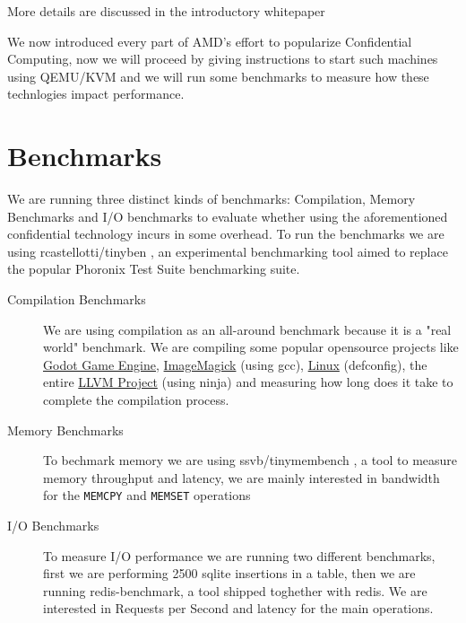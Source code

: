 \documentclass[twocolumn]{article}
\begin{document}
More details are discussed in the introductory whitepaper \cite{sev-snp}

We now introduced every part of AMD's effort to popularize Confidential Computing, now we will proceed by giving instructions to start such machines using QEMU/KVM and we will run some benchmarks to measure how these technlogies impact performance.


\section{Benchmarks}

We are running three distinct kinds of benchmarks: Compilation, Memory Benchmarks and I/O benchmarks to evaluate whether using the aforementioned confidential technology incurs in some overhead. To run the benchmarks we are using rcastellotti/tinyben \cite{tinyben}, an experimental benchmarking tool aimed to replace the popular Phoronix Test Suite \cite{pts} benchmarking suite.

\begin{description}
    \item[Compilation Benchmarks] We are using compilation as an all-around benchmark because it is a "real world" benchmark. We are compiling some popular opensource projects like \href{https://github.com/godotengine/godot}{Godot Game Engine}, \href{https://github.com/imagemagick/imagemagick}{ImageMagick} (using gcc), \href{https://git.kernel.org/pub/scm/linux/kernel/git/torvalds/linux.git}{Linux} (defconfig), the entire \href{https://github.com/llvm/llvm-project}{LLVM Project} (using ninja) and measuring how long does it take to complete the compilation process.
    \item[Memory Benchmarks] To bechmark memory we are using ssvb/tinymembench \cite{tinymembench}, a tool to measure memory throughput and latency, we are mainly interested in bandwidth for the \texttt{MEMCPY} and \texttt{MEMSET} operations
    \item[I/O Benchmarks] To measure I/O performance we are running two different benchmarks, first we are performing 2500 sqlite insertions in a table, then we are running redis-benchmark, a tool shipped toghether with redis. We are interested in Requests per Second and latency for the main operations. 
\end{description}

\subsection{}
\end{document}
